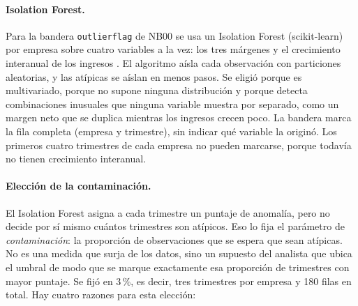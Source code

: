 \documentclass[12pt,letterpaper,oneside]{report}
\renewcommand{\_}{\UnderscoreOriginal\allowbreak}
\begin{document}
\paragraph{Isolation Forest.} Para la bandera \texttt{outlier\_flag} de NB00 se usa un Isolation Forest (scikit-learn) por empresa sobre cuatro variables a la vez: los tres márgenes y el crecimiento interanual de los ingresos \parencite{Liu2008}. El algoritmo aísla cada observación con particiones aleatorias, y las atípicas se aíslan en menos pasos. Se eligió porque es multivariado, porque no supone ninguna distribución y porque detecta combinaciones inusuales que ninguna variable muestra por separado, como un margen neto que se duplica mientras los ingresos crecen poco. La bandera marca la fila completa (empresa y trimestre), sin indicar qué variable la originó. Los primeros cuatro trimestres de cada empresa no pueden marcarse, porque todavía no tienen crecimiento interanual.

\paragraph{Elección de la contaminación.} El Isolation Forest asigna a cada trimestre un puntaje de anomalía, pero no decide por sí mismo cuántos trimestres son atípicos. Eso lo fija el parámetro de \emph{contaminación}: la proporción de observaciones que se espera que sean atípicas. No es una medida que surja de los datos, sino un supuesto del analista que ubica el umbral de modo que se marque exactamente esa proporción de trimestres con mayor puntaje. Se fijó en 3\,\%, es decir, tres trimestres por empresa y 180 filas en total. Hay cuatro razones para esta elección:
\end{document}
